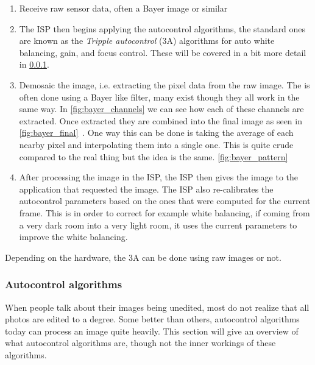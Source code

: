 \begin{enumerate}
    \item Receive raw sensor data, often a Bayer image or similar

    \item The ISP then begins applying the autocontrol algorithms, the standard
        ones are known as the \textit{Tripple autocontrol} (3A) algorithms for
        auto white balancing, gain, and focus control\cite{libcameraStack}. These will be covered
        in a bit more detail in \cref{section:autocontrol}.

    \item Demosaic the image, i.e. extracting the pixel data from the raw
        image. The is often done using a Bayer like filter, many exist though
        they all work in the same way. In \cref{fig:bayer_channels} we can see
        how each of these channels are extracted. Once extracted they are
        combined into the final image as seen in \cref{fig:bayer_final}~\cite{li2008image, libcameraStack}. One
        way this can be done is taking the average of each nearby pixel and
        interpolating them into a single one. This is quite crude compared to
        the real thing but the idea is the same. \cref{fig:bayer_pattern}

    \item After processing the image in the ISP, the ISP then gives the image
        to the application that requested the image. The ISP also re-calibrates
        the autocontrol parameters based on the ones that were computed for the
        current frame. This is in order to correct for example white balancing,
        if coming from a very dark room into a very light room, it uses the
        current parameters to improve the white balancing.

\end{enumerate}

Depending on the hardware, the 3A can be done using raw images or not.

\subsubsection{Autocontrol algorithms} \label{section:autocontrol}

When people talk about their images being unedited, most do not realize that all
photos are edited to a degree. Some better than others, autocontrol algorithms
today can process an image quite heavily. This section will give an overview of
what autocontrol algorithms are, though not the inner workings of these
algorithms.

